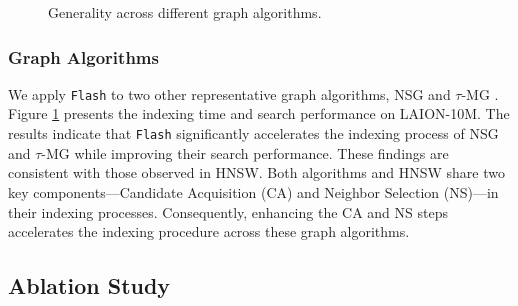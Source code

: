 \begin{figure}
  \setlength{\abovecaptionskip}{0cm}
  \setlength{\belowcaptionskip}{0cm}
  \centering
  \footnotesize
  \hspace{0.15cm}
  \newline
  \caption{{Generality across different graph algorithms.}}
  \label{fig: generality graph}
  \vspace{-0.2cm}
\end{figure}

\subsubsection{\textbf{{Graph Algorithms}}}
\label{subsubsec: graph algorithms}
{We apply \texttt{Flash} to two other representative graph algorithms, NSG \cite{NSG} and $\tau$-MG \cite{tau-MG}. Figure \ref{fig: generality graph} presents the indexing time and search performance on LAION-10M. The results indicate that \texttt{Flash} significantly accelerates the indexing process of NSG and $\tau$-MG while improving their search performance. These findings are consistent with those observed in HNSW. Both algorithms and HNSW share two key components—Candidate Acquisition (CA) and Neighbor Selection (NS)—in their indexing processes. Consequently, enhancing the CA and NS steps accelerates the indexing procedure across these graph algorithms.}

\subsection{Ablation Study}
\label{subsec: ablation}

\begin{table}[t]
\vspace{-0.2cm}
 \fontsize{7.5pt}{4mm}\selectfont
  \caption{L1 cache misses before and after optimization.}
  \vspace{-0.4cm}
  \label{tab:cache misses}
  \vspace{-0.3cm}
\end{table}


